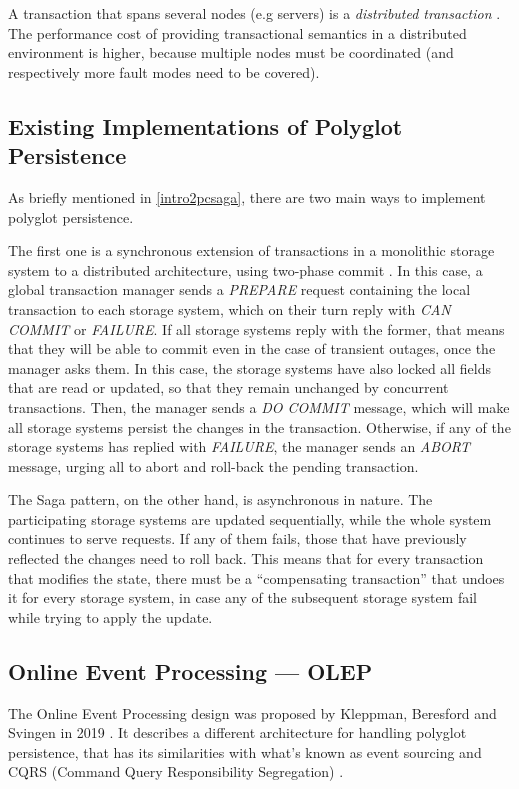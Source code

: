 \documentclass[12pt]{article}
\begin{document}
A transaction that spans several nodes (e.g servers) is a \textit{distributed transaction} \cite{wikiDistrTrans}. The performance cost of providing transactional semantics in a distributed environment is higher, because multiple nodes must be coordinated (and respectively more fault modes need to be covered).

\subsection{Existing Implementations of Polyglot Persistence}
\label{priorPoly}

As briefly mentioned in \ref{intro2pcsaga}, there are two main ways to implement polyglot persistence.

The first one is a synchronous extension of transactions in a monolithic storage system to a distributed architecture, using two-phase commit \cite{2pcWiki}. In this case, a global transaction manager sends a \textit{PREPARE} request containing the local transaction to each storage system, which on their turn reply with \textit{CAN COMMIT} or \textit{FAILURE}. If all storage systems reply with the former, that means that they will be able to commit even in the case of transient outages, once the manager asks them. In this case, the storage systems have also locked all fields that are read or updated, so that they remain unchanged by concurrent transactions. Then, the manager sends a \textit{DO COMMIT} message, which will make all storage systems persist the changes in the transaction. Otherwise, if any of the storage systems has replied with \textit{FAILURE}, the manager sends an \textit{ABORT} message, urging all to abort and roll-back the pending transaction.

The Saga pattern, on the other hand, is asynchronous in nature. The participating storage systems are updated sequentially, while the whole system continues to serve requests. If any of them fails, those that have previously reflected the changes need to roll back. This means that for every transaction that modifies the state, there must be a ``compensating transaction'' that undoes it for every storage system, in case any of the subsequent storage system fail while trying to apply the update.

\subsection{Online Event Processing --- OLEP}
\label{prepOLEP}

The Online Event Processing design was proposed by Kleppman, Beresford and Svingen in 2019 \cite{OLEP}. It describes a different architecture for handling polyglot persistence, that has its similarities with what's known as event sourcing \cite{fowEventSourcing} and CQRS (Command Query Responsibility Segregation) \cite{fowCQRS}.
\end{document}
